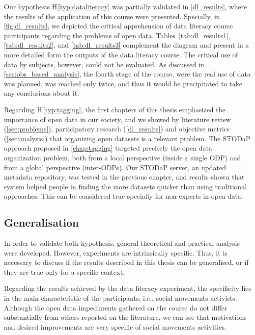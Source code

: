 Our hypothesis H\ref{hyp:dataliteracy} was partially validated in \autoref{dl_results}, where the results of the application of this course were presented.
Specially, in \autoref{fig:dl_results}, we depicted the critical apprehension of data literacy course participants regarding the problems of open data.
Tables~\ref{tab:dl_results1}, \ref{tab:dl_results2}, and \ref{tab:dl_results3} complement the diagram and present in a more detailed form the outputs of the data literacy course.
The critical use of data by subjects, however, could not be evaluated.
As discussed in \autoref{sec:obs_based_analysis}, the fourth stage of the course, were the real use of data was planned, was reached only twice, and thus it would be precipitated to take any conclusions about it.

Regarding H\ref{hyp:tagging}, the first chapters of this thesis emphasized the importance of open data in our society, and we showed by literature review (\autoref{sec:problems}), participatory research (\autoref{dl_results}) and objective metrics (\autoref{sec:analysis}) that organizing open datasets is a relevant problem.
The STODaP approach proposed in \autoref{chap:tagging} targeted precisely the open data organization problem, both from a local perspective (inside a single ODP) and from a global perspective (inter-ODPs).
Our STODaP server, an updated metadata repository, was tested in the previous chapter, and results shown that system helped people in finding the more datasets quicker than using traditional approaches.
This can be considered true specially for non-experts in open data.

\subsection{Generalisation}

In order to validate both hypothesis, general theoretical and practical analysis were developed.
However, experiments are intrinsically specific.
Thus, it is necessary to discuss if the results described in this thesis can be generalised, or if they are true only for a specific context.

Regarding the results achieved by the data literacy experiment, the specificity lies in the main characteristic of the participants, i.e., social movements activists.
Although the open data impediments gathered on the course do not differ substantially from others reported on the literature, we can see that motivations and desired improvements are very specific of social movements activities.

